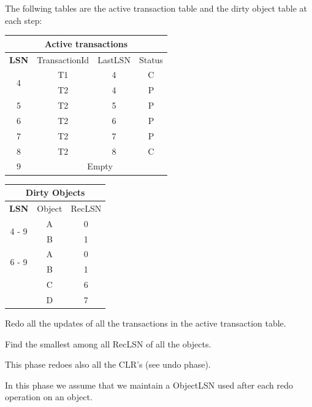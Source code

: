 \documentclass{beamer}
\begin{document}
\begin{slide}{
	\item The follwing tables are the active transaction table and the dirty object table at each step:
	
	\begin{table}
		\tiny
		\begin{tabular}{|c|c|c|c|}
			\hline
			\multicolumn{4}{|c|}{\textbf{Active transactions}} \\
			\hline
			\textbf{LSN} & TransactionId & LastLSN & Status \\
			\hline
			\multirow{2}{*}{4} & T1 & 4 & C \\
			& T2 & 4 & P \\
			\hline
			5 & T2 & 5 & P \\ 
			\hline
			6 & T2 & 6 & P \\
			\hline
			7 & T2 & 7 & P \\
			\hline
			8 & T2 & 8 & C \\
			\hline
			9 & \multicolumn{3}{|c|}{Empty} \\
			\hline
		\end{tabular}
	\end{table}
	
	\begin{table}
		\tiny
		\begin{tabular}{|c|c|c|}
			\hline
			\multicolumn{3}{|c|}{\textbf{Dirty Objects}} \\
			\hline
			\textbf{LSN} & Object & RecLSN \\
			\hline
			\multirow{2}{*}{4 - 9} & A & 0 \\
			& B & 1 \\
			\hline
			\multirow{2}{*}{6 - 9} & A & 0 \\
			& B & 1 \\
			& C & 6 \\
			& D & 7 \\
			\hline
		\end{tabular}
	\end{table}
}\end{slide}

\begin{slide}{
	\item Redo all the updates of all the transactions in the active transaction table.
	\item Find the smallest among all RecLSN of all the objects.
	\item This phase redoes also all the CLR's (see undo phase).
	\item In this phase we assume that we maintain a ObjectLSN used after each redo operation on an object. 
}\end{slide}
\end{document}
